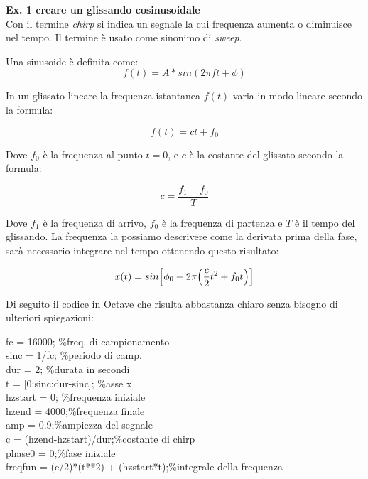 \documentclass[11pt]{article}
\begin{document}
\begin{multicols*}{2}
\parskip=0pt

\textbf{\textsf {Ex. 1 creare un glissando cosinusoidale}}\\

\noindent Con il termine \textit {chirp} si indica un segnale la cui frequenza aumenta o diminuisce nel tempo. Il termine è usato come sinonimo di \textit {sweep}.

Una sinusoide è definita come:
\[
f(t)=A*sin(2\pi ft + \phi)
\]

In un glissato lineare la frequenza istantanea $f(t)$ varia in modo lineare secondo la formula:

\[
f(t)=ct + f_0
\]

Dove $f_0$ è la frequenza al punto $t=0$, e $c$ è la costante del glissato secondo la formula:

\[
c = \frac{f_1 - f_0}{T}
\]

Dove $f_1$ è la frequenza di arrivo, $f_0$ è la frequenza di partenza e $T$ è il tempo del glissando.
La frequenza la possiamo descrivere come la derivata prima della fase, sarà necessario integrare nel tempo ottenendo questo risultato:

\[
x(t) = sin \Bigl [\phi_0 + 2\pi \Bigl(\frac{c}{2}t^2 + f_0t\Bigl) \Bigl]
\]

Di seguito il codice in Octave che risulta abbastanza chiaro senza bisogno di ulteriori spiegazioni:

\begin{center}
\begin{minipage}[c]{6.2cm}
\begin{sffamily}
\scriptsize

fc = 16000;	\%freq. di campionamento\\
sinc = 1/fc; \%periodo di camp.\\
dur = 2;	\%durata in secondi\\
t = [0:sinc:dur-sinc]; \%asse x\\							

hzstart = 0; \%frequenza iniziale\\
hzend = 4000;\%frequenza finale\\
amp = 0.9;\%ampiezza del segnale\\

c = (hzend-hzstart)/dur;\%costante di chirp\\
phase0 = 0;\%fase iniziale\\
freqfun = (c/2)*(t**2) + (hzstart*t);\%integrale della frequenza\\


\end{sffamily}
\end{minipage}
\end{center}
\end{multicols*}
\end{document}
